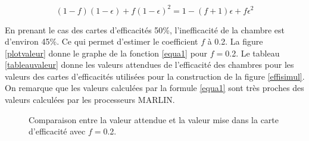 \begin{equation}
(1-f)(1-\epsilon)+f(1-\epsilon)^2=1-(f+1)\epsilon+f\epsilon^2 \label{equa1}
\end{equation}

En prenant le cas des cartes d'efficacités \num{50}\%, l'inefficacité de la chambre est d'environ \num{45}\%. Ce qui permet d'estimer le coefficient $f$ à \num{0.2}. La figure \ref{plotvaleur} donne le graphe de la fonction \ref{equa1} pour $f=$\num{0.2}. Le tableau \ref{tableauvaleur} donne les valeurs attendues de l'efficacité des chambres pour les valeurs des cartes d'efficacités utilisées pour la construction de la figure \ref{effisimul}. On remarque que les valeurs calculées par la formule \ref{equa1} sont très proches des valeurs calculées par les processeurs MARLIN.
\vspace*{-0.6cm}
	\begin{figure}[ht!]
    \hfill
	\caption{Comparaison entre la valeur attendue et la valeur mise dans la carte d'efficacité avec $f=$\num{0.2}. }
	\label{Comparaison}
\end{figure}

